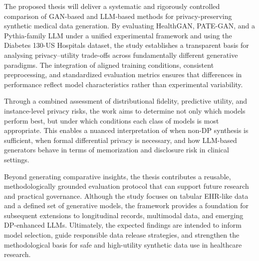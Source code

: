 \documentclass[master,proposal,extern,palatino]{rgseThesis}
\begin{document}

The proposed thesis will deliver a systematic and rigorously controlled comparison of GAN-based and LLM-based methods for privacy-preserving synthetic medical data generation. By evaluating HealthGAN, PATE-GAN, and a Pythia-family LLM under a unified experimental framework and using the Diabetes 130-US Hospitals dataset, the study establishes a transparent basis for analysing privacy–utility trade-offs across fundamentally different generative paradigms. The integration of aligned training conditions, consistent preprocessing, and standardized evaluation metrics ensures that differences in performance reflect model characteristics rather than experimental variability.

Through a combined assessment of distributional fidelity, predictive utility, and instance-level privacy risks, the work aims to determine not only which models perform best, but under which conditions each class of models is most appropriate. This enables a nuanced interpretation of when non-DP synthesis is sufficient, when formal differential privacy is necessary, and how LLM-based generators behave in terms of memorization and disclosure risk in clinical settings.

Beyond generating comparative insights, the thesis contributes a reusable, methodologically grounded evaluation protocol that can support future research and practical governance. Although the study focuses on tabular EHR-like data and a defined set of generative models, the framework provides a foundation for subsequent extensions to longitudinal records, multimodal data, and emerging DP-enhanced LLMs. Ultimately, the expected findings are intended to inform model selection, guide responsible data release strategies, and strengthen the methodological basis for safe and high-utility synthetic data use in healthcare research.
\newpage
\printbibliography[sorting=none]
\end{document}
